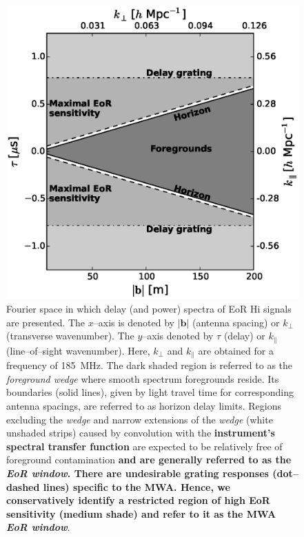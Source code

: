 \documentclass[preprint2,iop,numberedappendix,twocolappendix,appendixfloats]{emulateapj}
\begin{document}
\begin{figure}[htb]
\centering
\includegraphics[width=\linewidth]{figure1.eps}
\caption{Fourier space in which delay (and power) spectra of EoR H{\sc i} signals are presented. The $x$--axis is denoted by $|\boldsymbol{b}|$ (antenna spacing) or $k_\perp$ (transverse wavenumber). The $y$--axis denoted by $\tau$ (delay) or $k_\parallel$ (line--of--sight wavenumber). Here, $k_\perp$ and $k_\parallel$ are obtained for a frequency of 185~MHz. The dark shaded region is referred to as the {\it foreground wedge} where smooth spectrum foregrounds reside. Its boundaries (solid lines), given by light travel time for corresponding antenna spacings, are referred to as horizon delay limits. Regions excluding the {\it wedge} and narrow extensions of the {\it wedge} (white unshaded strips) caused by convolution with the {\bf instrument's spectral transfer function} are expected to be relatively free of foreground contamination {\bf and are generally referred to as the {\it EoR window}. There are undesirable grating responses (dot--dashed lines) specific to the MWA. Hence, we conservatively identify a restricted region of high EoR sensitivity (medium shade) and refer to it as the MWA {\it EoR window}}. \label{fig:fourier-space}}
\end{figure}
\end{document}
